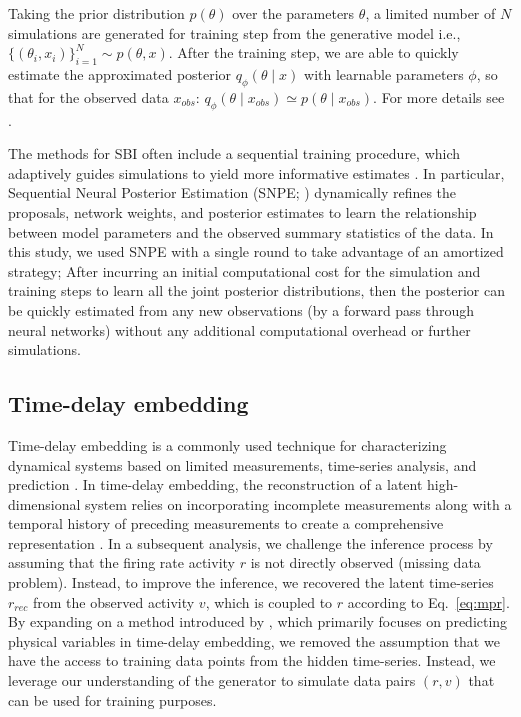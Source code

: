 \documentclass[preprint,11pt,authoryear]{elsarticle}
\begin{document}
Taking the prior distribution $p(\theta)$ over the parameters $\theta$, a limited number of $N$ simulations are generated for training step from the generative model i.e.,  $\{(\theta_i, x_i)\}_{i=1}^{N} \sim p(\theta, x)$. After the training step, we are able to quickly estimate the approximated posterior $q_{\phi}(\theta \mid x)$ with learnable parameters $\phi$, so that for the observed data $x_{obs}$: $q_{\phi}(\theta \mid x_{obs}) \simeq p(\theta \mid x_{obs})$. For more details see \cite{Goncalves2020, Hashemi2023}. 

The methods for SBI often include a sequential training procedure, which adaptively guides simulations to yield more informative estimates \citep{Papamakarios2019b, Lueckmann2019, Durkan2020, Wiqvist2021, Deistler2022}. In particular, Sequential Neural Posterior Estimation (SNPE; \cite{Greenberg2019, Goncalves2020})  dynamically refines the proposals, network weights, and posterior estimates to learn the relationship between model parameters and the observed summary statistics of the data. In this study, we used SNPE with a single round to take advantage of an amortized strategy; After incurring an initial computational cost for the simulation and training steps to learn all the joint posterior distributions, then the posterior can be quickly estimated from any new observations (by a forward pass through neural networks)  without any additional computational overhead or further simulations.




\subsection{Time-delay embedding}

Time-delay embedding is a commonly used technique for characterizing dynamical systems based on limited measurements, time-series analysis, and prediction \citep{Takens2006}. In time-delay embedding, the reconstruction of a latent high-dimensional system relies on incorporating incomplete measurements along with a temporal history of preceding measurements to create a comprehensive representation \citep{Kennel1992, Hirsh2021}.
In a subsequent analysis, we challenge the inference process by assuming that the firing rate activity $r$ is not directly observed (missing data problem). Instead, to improve the inference, we recovered the latent time-series $r_{rec}$ from the observed activity $v$, which is coupled to $r$ according to Eq.~\ref{eq:mpr}.
By expanding on a method introduced by \cite{Abarbanel}, which primarily focuses on predicting physical variables in time-delay embedding, we removed the assumption that we have the access to training data points from the hidden time-series. Instead, we leverage our understanding of the generator to simulate data pairs $(r, v)$ that can be used for training purposes.
\end{document}
